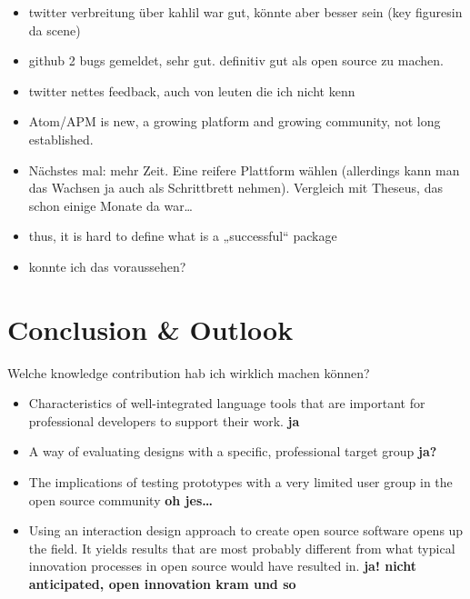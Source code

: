 \begin{itemize}
\itemsep1pt\parskip0pt
\item
  twitter verbreitung über kahlil war gut, könnte aber besser sein (key
  figuresin da scene)
\item
  github 2 bugs gemeldet, sehr gut. definitiv gut als open source zu
  machen.
\item
  twitter nettes feedback, auch von leuten die ich nicht kenn
\end{itemize}

\begin{itemize}
\item
  Atom/APM is new, a growing platform and growing community, not long
  established.
\item
  Nächstes mal: mehr Zeit. Eine reifere Plattform wählen (allerdings
  kann man das Wachsen ja auch als Schrittbrett nehmen). Vergleich mit
  Theseus, das schon einige Monate da war\ldots{}
\item
  thus, it is hard to define what is a „successful“ package
\item
  konnte ich das voraussehen?
\end{itemize}

\chapter{Conclusion \& Outlook}\label{conclusion-outlook}

Welche knowledge contribution hab ich wirklich machen können?

\begin{itemize}
\itemsep1pt\parskip0pt
\item
  Characteristics of well-integrated language tools that are important
  for professional developers to support their work. \textbf{ja}
\item
  A way of evaluating designs with a specific, professional target group
  \textbf{ja?}
\item
  The implications of testing prototypes with a very limited user group
  in the open source community \textbf{oh jes\ldots{}}
\item
  Using an interaction design approach to create open source software
  opens up the field. It yields results that are most probably different
  from what typical innovation processes in open source would have
  resulted in. \textbf{ja! nicht anticipated, open innovation kram und
  so}
\end{itemize}
